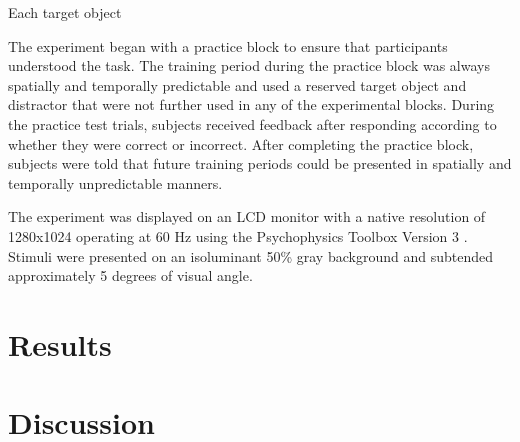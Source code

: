 \documentclass[dwyatte_dissertation.tex]{subfiles}
\begin{document}
Each target object 

The experiment began with a practice block to ensure that participants understood the task. The training period during the practice block was always spatially and temporally predictable and used a reserved target object and distractor that were not further used in any of the experimental blocks. During the practice test trials, subjects received feedback after responding according to whether they were correct or incorrect. After completing the practice block, subjects were told that future training periods could be presented in spatially and temporally unpredictable manners.

The experiment was displayed on an LCD monitor with a native resolution of 1280x1024 operating at 60 Hz using the Psychophysics Toolbox Version 3 \cite{Brainard97,Pelli97}. Stimuli were presented on an isoluminant 50\% gray background and subtended approximately 5 degrees of visual angle.

\section{Results}

\section{Discussion}



\end{document}
